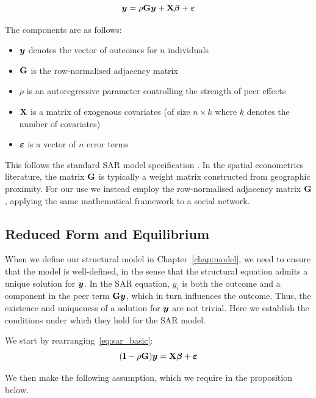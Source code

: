 \begin{equation}
\label{eq:sar_basic}
    \bm{y} = \rho \mathbf{G}\bm{y} + \mathbf{X}\bm{\beta} + \bm{\varepsilon}
\end{equation}

The components are as follows:
\begin{itemize}
    \item $\bm{y}$ denotes the vector of outcomes for $n$ individuals
    \item $\mathbf{G}$ is the row-normalised adjacency matrix
    \item $\rho$ is an autoregressive parameter controlling the strength of peer effects
    \item $\mathbf{X}$ is a matrix of exogenous covariates (of size $n \times k$ where $k$ denotes the number of covariates)
    \item $\bm{\varepsilon}$ is a vector of $n$ error terms
\end{itemize}

This follows the standard SAR model specification \parencite[Eq.~(1.17), p.~16; Ch.~2.6, p.~32]{LeSage2009}. In the spatial econometrics literature, the matrix $\mathbf{G}$ is typically a weight matrix constructed from geographic proximity. For our use we instead employ the row-normalised adjacency matrix $\mathbf{G}$, applying the same mathematical framework to a social network.

\subsection{Reduced Form and Equilibrium}

When we define our structural model in Chapter~\ref{chap:model}, we need to ensure that the model is well-defined, in the sense that the structural equation admits a unique solution for $\bm{y}$. In the SAR equation, $y_i$ is both the outcome and a component in the peer term $\mathbf{G}\bm{y}$, which in turn influences the outcome. Thus, the existence and uniqueness of a solution for $\bm{y}$ are not trivial. Here we establish the conditions under which they hold for the SAR model.

We start by rearranging~\eqref{eq:sar_basic}:
\begin{equation}
    \label{eq:sar_basic_rearranged}
    (\mathbf{I} - \rho\mathbf{G})\bm{y} = \mathbf{X}\bm{\beta} + \bm{\varepsilon}
\end{equation}

We then make the following assumption, which we require in the proposition below.

